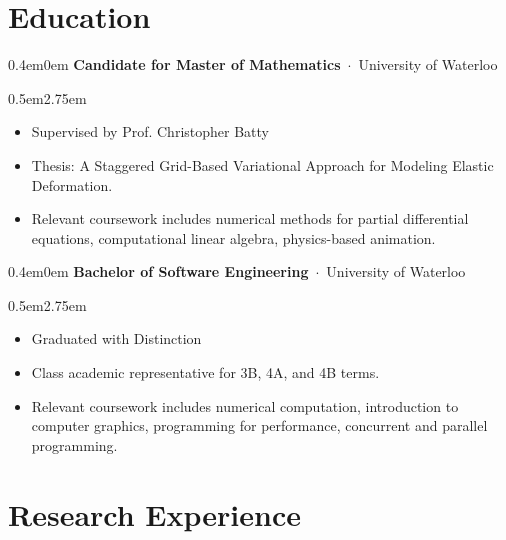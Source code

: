 \documentclass[oneside, 11pt]{memoir}
\newcommand{\entryGeneral}[5]{
  \begin{adjustwidth}{0.4em}{0em}%
  \textbf{#1}~$\cdot$~#2\sourceatright{\Date \small #3~--~#4}%
  \begin{adjustwidth}{0.5em}{2.75em}
    \begin{flushleft}
      {
        \Merriweather \small
        #5
      }%
    \end{flushleft}
  \end{adjustwidth}
  \end{adjustwidth}
}
\newcommand{\entryEducation}[4]{
  \begin{adjustwidth}{0.4em}{0em}%
  \textbf{#1}~$\cdot$~#2\sourceatright{\Date \small #3}%
  \begin{adjustwidth}{0.5em}{2.75em}
    \begin{flushleft}
      {
        \Merriweather \small
        #4
      }%
    \end{flushleft}
  \end{adjustwidth}
  \end{adjustwidth}
}
\begin{document}
\section*{Education}
\entryEducation{Candidate for Master of Mathematics}{University of Waterloo}{2025}{
    \begin{itemize}
        \item {
            Supervised by Prof. Christopher Batty
        }
        \item {
            Thesis: A Staggered Grid-Based Variational Approach for Modeling Elastic Deformation.
        }
        \item {
            Relevant coursework includes numerical methods for partial differential equations, computational linear algebra, physics-based animation.  
        }
    \end{itemize}
}


\entryEducation{Bachelor of Software Engineering}{University of Waterloo}{2022}{
    \begin{itemize}
        \item {
            Graduated with Distinction
        }
        \item {
            Class academic representative for 3B, 4A, and 4B terms.
        }
        \item {
          Relevant coursework includes numerical computation, introduction to computer graphics, programming for performance, concurrent and parallel programming.
        }
    \end{itemize}
}


%
\section*{Research Experience}


\end{document}
